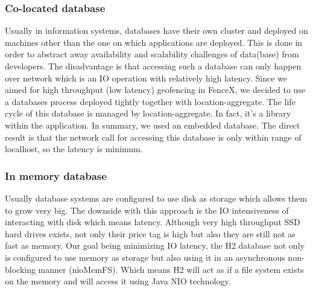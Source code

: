 \documentclass[a4]{report}
\begin{document}
        \subsubsection{Co-located database}
        Usually in information systems, databases have their own cluster and deployed on machines other than the one on
        which applications are deployed.
        This is done in order to abstract away availability and scalability challenges of data(base) from developers.
        The disadvantage is that accessing such a database can only happen over network which is an IO operation with
        relatively high latency.
        Since we aimed for high throughput (low latency) geofencing in FenceX, we decided to use a databases process
        deployed tightly together with location-aggregate.
        The life cycle of this database is managed by location-aggregate.
        In fact, it's a library within the application.
        In summary, we used an embedded database.
        The direct result is that the network call for accessing this database is only within range of localhost, so the
        latency is minimum.

        \subsubsection{In memory database}
        Usually database systems are configured to use disk as storage which allows them to grow very big.
        The downside with this approach is the IO intensiveness of interacting with disk which means latency.
        Although very high throughput SSD hard drives exists, not only their price tag is high but also they are still
        not as fast as memory.
        Our goal being minimizing IO latency, the H2 database not only is configured to use memory as storage but also
        using it in an asynchronous non-blocking manner (nioMemFS).
        Which means H2 will act as if a file system exists on the memory and will access it using Java NIO \cite{JavaNio} technology.
\end{document}
